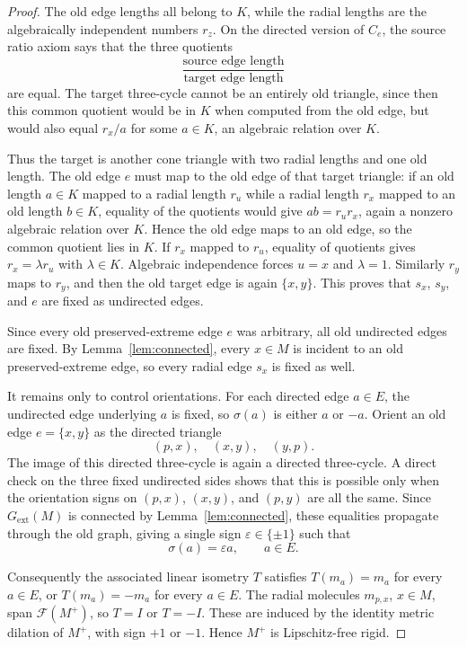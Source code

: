\documentclass[11pt]{article}
\newcommand{\F}{\mathcal F}
\begin{document}
\begin{proof}
The old edge lengths all belong to \(K\), while the radial lengths are the algebraically independent numbers \(r_z\).  On the directed version of \(C_e\), the source ratio axiom says that the three quotients
\[
  \frac{\text{source edge length}}{\text{target edge length}}
\]
are equal.  The target three-cycle cannot be an entirely old triangle, since then this common quotient would be in \(K\) when computed from the old edge, but would also equal \(r_x/a\) for some \(a\in K\), an algebraic relation over \(K\).

Thus the target is another cone triangle with two radial lengths and one old length.  The old edge \(e\) must map to the old edge of that target triangle: if an old length \(a\in K\) mapped to a radial length \(r_u\) while a radial length \(r_x\) mapped to an old length \(b\in K\), equality of the quotients would give \(ab=r_ur_x\), again a nonzero algebraic relation over \(K\).  Hence the old edge maps to an old edge, so the common quotient lies in \(K\).  If \(r_x\) mapped to \(r_u\), equality of quotients gives \(r_x=\lambda r_u\) with \(\lambda\in K\).  Algebraic independence forces \(u=x\) and \(\lambda=1\).  Similarly \(r_y\) maps to \(r_y\), and then the old target edge is again \(\{x,y\}\).  This proves that \(s_x\), \(s_y\), and \(e\) are fixed as undirected edges.

Since every old preserved-extreme edge \(e\) was arbitrary, all old undirected edges are fixed.  By Lemma~\ref{lem:connected}, every \(x\in M\) is incident to an old preserved-extreme edge, so every radial edge \(s_x\) is fixed as well.

It remains only to control orientations.  For each directed edge \(a\in E\), the undirected edge underlying \(a\) is fixed, so \(\sigma(a)\) is either \(a\) or \(-a\).  Orient an old edge \(e=\{x,y\}\) as the directed triangle
\[
  (p,x),\quad (x,y),\quad (y,p).
\]
The image of this directed three-cycle is again a directed three-cycle.  A direct check on the three fixed undirected sides shows that this is possible only when the orientation signs on \((p,x)\), \((x,y)\), and \((p,y)\) are all the same.  Since \(G_{\mathrm{ext}}(M)\) is connected by Lemma~\ref{lem:connected}, these equalities propagate through the old graph, giving a single sign \(\varepsilon\in\{\pm1\}\) such that
\[
  \sigma(a)=\varepsilon a,\qquad a\in E.
\]

Consequently the associated linear isometry \(T\) satisfies \(T(m_a)=m_a\) for every \(a\in E\), or \(T(m_a)=-m_a\) for every \(a\in E\).  The radial molecules \(m_{p,x}\), \(x\in M\), span \(\F(M^+)\), so \(T=I\) or \(T=-I\).  These are induced by the identity metric dilation of \(M^+\), with sign \(+1\) or \(-1\).  Hence \(M^+\) is Lipschitz-free rigid.
\end{proof}
\end{document}
